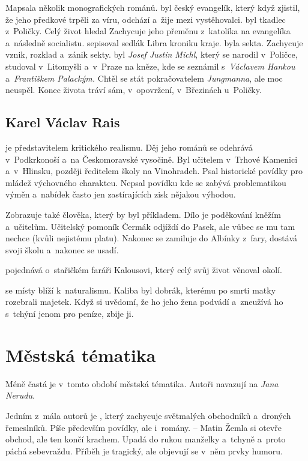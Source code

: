 Mapsala několik monografických románů. 
 byl český evangelík, který když zjistil, že jeho
předkové trpěli za víru, odchází a~žije mezi vystěhovalci.
 byl tkadlec z~Poličky. Celý život hledal
 Zachycuje jeho přeměnu z~katolíka
na evangelíka a~následně socialistu.
 sepisoval sedlák Libra kroniku kraje.
 byla sekta. Zachycuje vznik, rozklad a~zánik sekty. 
 byl \emph{Josef Justin Michl}, který se narodil v~Poličce,
studoval v~Litomyšli a~v~Praze na kněze, kde se seznámil 
s~\emph{Václavem Hankou} a~\emph{Františkem Palackým.}
Chtěl se stát pokračovatelem \emph{Jung\-manna}, ale moc neuspěl.
Konec života tráví sám, v~opovržení, v~Březinách u~Poličky.

\subsection*{Karel Václav Rais}
 je představitelem kritického realismu. Děj
jeho románů se odehrává v~Podkrkonoší a~na Českomoravské vysočině. Byl
učitelem v~Trhové Kamenici a~v~Hlinsku, později ředitelem školy na
Vinohradeh. Psal historické povídky pro mládež výchovného charakteu.
Nepsal povídku  kde se zabývá problematikou výměn
a~nabídek často jen zastírajících zisk nějakou výhodou.

Zobrazuje také člověka, který by byl příkladem. Dílo 
 je poděkování kněžím a~učitelům.
Učitelský pomoník Čermák odjíždí do Pasek, ale vůbec se mu tam nechce
(kvůli nejistému platu). Nakonec se zamiluje do Albínky z~fary, dostává
svoji školu a~nakonec se usadí.

 pojednává o~stařičkém faráři Kalousovi, který celý svůj
život věnoval okolí.

 se místy blíží k~naturalismu. Kaliba byl dobrák,
kterému po smrti matky rozebrali majetek. Když si uvědomí, že ho
jeho žena podvádí a~zneužívá ho s~tchýní jenom pro peníze, zbije ji.

\section{Městská tématika}
Méně častá je v~tomto období městská tématika. Autoři navazují na
\emph{Jana Nerudu}. 

Jedním z~mála autorů je , který zachycuje
světmalých obchodníků a~droných řemeslníků. Píše především povídky, ale
i~romány.  -- Matin Žemla si otevře obchod, ale
ten končí krachem. Upadá do rukou manželky a~tchyně a~proto páchá
sebevraždu. Příběh je tragický, ale objevují se v~něm prvky humoru.

